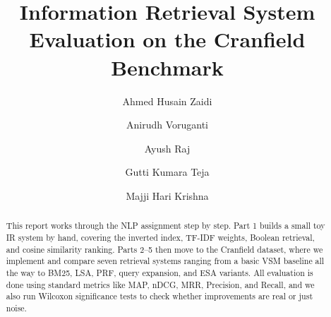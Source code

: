 \documentclass{svproc}
\begin{document}
    \pagestyle{plain}
    \setcounter{page}{2}
    \renewcommand{\contentsname}{\centering\Large\bfseries Table of Contents}
    \tableofcontents
    \clearpage

    \setcounter{page}{1}
    \pagestyle{headings}

    \title{Information Retrieval System Evaluation on the Cranfield Benchmark}
    \author{Ahmed Husain Zaidi \and Anirudh Voruganti \and Ayush Raj \and Gutti Kumara Teja \and Majji Hari Krishna}

    \begingroup
    \let\oldaddcontentsline\addcontentsline
    \renewcommand{\addcontentsline}[3]{}
    \maketitle
    \endgroup

    \begin{abstract}
    This report works through the NLP assignment step by step. Part 1 builds a small toy IR system by hand, covering the inverted index, TF-IDF weights, Boolean retrieval, and cosine similarity ranking. Parts 2--5 then move to the Cranfield dataset, where we implement and compare seven retrieval systems ranging from a basic VSM baseline all the way to BM25, LSA, PRF, query expansion, and ESA variants. All evaluation is done using standard metrics like MAP, nDCG, MRR, Precision, and Recall, and we also run Wilcoxon significance tests to check whether improvements are real or just noise.
    \end{abstract}

\end{document}
